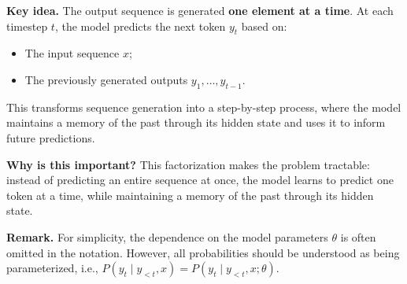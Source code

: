 \noindent
\textcolor{Green3}{ \textbf{Key idea.}} The output sequence is generated \textbf{one element at a time}. At each timestep $t$, the model predicts the next token $y_t$ based on:
\begin{itemize}
    \item The input sequence $x$;
    \item The previously generated outputs $y_1, \dots, y_{t-1}$.
\end{itemize}
This transforms sequence generation into a step-by-step process, where the model maintains a memory of the past through its hidden state and uses it to inform future predictions.

\highspace
\textcolor{Green3}{ \textbf{Why is this important?}} This factorization makes the problem tractable: instead of predicting an entire sequence at once, the model learns to predict one token at a time, while maintaining a memory of the past through its hidden state.

\highspace
\textcolor{Green3}{ \textbf{Remark.}} For simplicity, the dependence on the model parameters $\theta$ is often omitted in the notation. However, all probabilities should be understood as being parameterized, i.e., $P\left(y_t \mid y_{<t}, x\right) = P\left(y_t \mid y_{<t}, x; \theta\right)$.